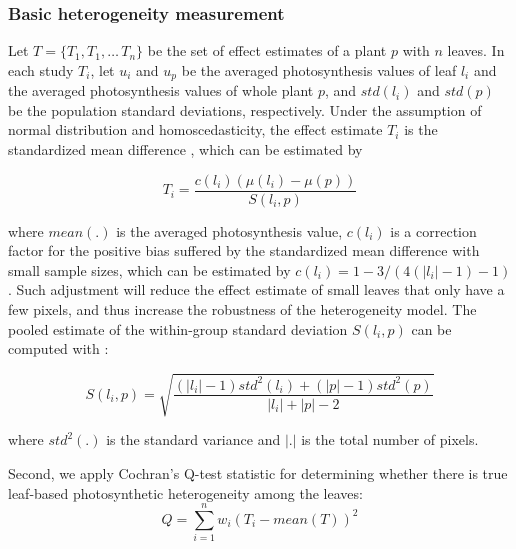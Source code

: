 {\subsubsection*{Basic heterogeneity measurement}

Let $T = \{T_{1}, T_{1}, \ldots\, T_{n}\}$ be the set of effect estimates of a plant $p$ with $n$ leaves. 
%
In each study $T_i$, let $u_i$ and $u_p$ be the averaged photosynthesis values of leaf $l_i$ and the averaged photosynthesis values of whole plant $p$, and $std(l_i)$ and $std(p)$ be the population standard deviations, respectively. Under the assumption of normal distribution and homoscedasticity, the effect estimate $T_i$ is the standardized mean difference \cite{hedges1998fixed}, which can be estimated by %

\begin{equation}\label{eq:effectestimate}
T_{i} =  \frac{c(l_i)\left(\mu(l_i)-\mu(p)\right)}{S(l_i,p)}
\end{equation}

\noindent where $mean(.)$ is the averaged photosynthesis value, $c(l_i)$ is a correction factor for the positive bias suffered by the standardized mean difference with small sample sizes, which can be estimated by $c(l_i) = 1-3/(4(|l_i|-1)-1)$ \cite{hedge1985statistical}. Such adjustment will reduce the effect estimate of small leaves that only have a few pixels, and thus increase the robustness of the heterogeneity model.
%
%
The pooled estimate of the within-group standard deviation $S(l_i, p)$ can be computed with \cite{hedges1998fixed}:

\begin{equation}\label{eq:S}
S(l_i, p) = \sqrt{\frac{(|l_i|-1)std^2(l_i)+(|p|-1)std^2(p)}{|l_i|+|p|-2}}
\end{equation}

\noindent where $std^2(.)$ is the standard variance and $|.|$ is the total number of pixels.

%

Second, we apply Cochran's Q-test statistic for determining whether there is true leaf-based photosynthetic heterogeneity among the leaves:
%
\begin{equation}\label{eq:Q}
Q=\sum_{i=1}^n w_i\left(T_i-mean(T)\right)^2
\end{equation}

}
